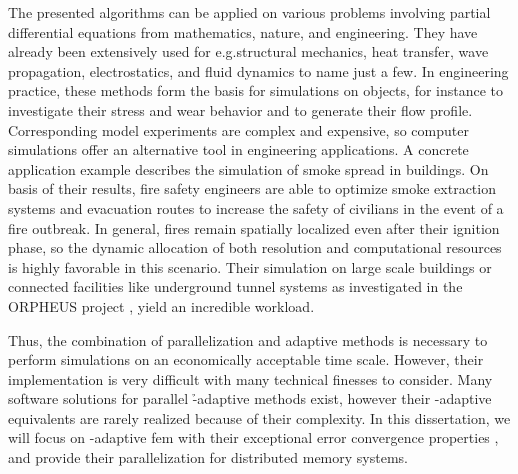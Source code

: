 
The presented algorithms can be applied on various problems involving partial differential equations from mathematics, nature, and engineering. They have already been extensively used for e.g.\@ structural mechanics, heat transfer, wave propagation, electrostatics, and fluid dynamics to name just a few.
In engineering practice, these methods form the basis for simulations on objects, for instance to investigate their stress and wear behavior and to generate their flow profile. Corresponding model experiments are complex and expensive, so computer simulations offer an alternative tool in engineering applications.
A concrete application example describes the simulation of smoke spread in buildings.
On basis of their results, fire safety engineers are able to optimize smoke extraction systems and evacuation routes to increase the safety of civilians in the event of a fire outbreak.
In general, fires remain spatially localized even after their ignition phase, so the dynamic allocation of both resolution and computational resources is highly favorable in this scenario.
Their simulation on large scale buildings or connected facilities like underground tunnel systems as investigated in the ORPHEUS project \parencite{arnold2017}, yield an incredible workload.


Thus, the combination of parallelization and adaptive methods is necessary to perform simulations on an economically acceptable time scale. However, their implementation is very difficult with many technical finesses to consider.
Many software solutions for parallel \h-adaptive methods exist, however their \hp-adaptive equivalents are rarely realized because of their complexity.
In this dissertation, we will focus on \hp-adaptive \gls{fem} with their exceptional error convergence properties \parencite{guo1986,babuska1996}, and provide their parallelization for distributed memory systems.

